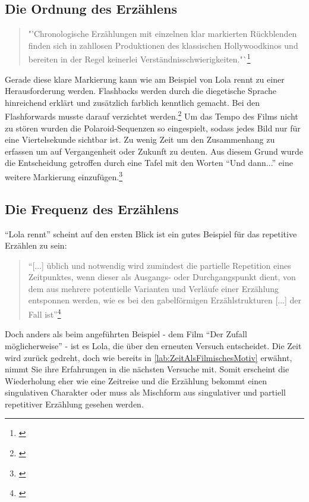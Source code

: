 \subsection{Die Ordnung des Erzählens}

\begin{quote}"'Chronologische Erzählungen mit einzelnen klar markierten Rückblenden finden sich in zahllosen Produktionen des klassischen Hollywoodkinos und bereiten in der Regel keinerlei Verständnisschwierigkeiten."`\footnote{\cite[S. 204]{keutzer2014filmanalyse}}\end{quote}
Gerade diese klare Markierung kann wie am Beispiel von Lola rennt zu einer Herausforderung werden. Flashbacks werden durch die diegetische Sprache hinreichend erklärt und zusätzlich farblich kenntlich gemacht. Bei den Flashforwards musste darauf verzichtet werden.\footnote{\cite[S. 7]{DIEDRINGLICHKEITDERLIEBE}}  Um das Tempo des Films nicht zu stören wurden die Polaroid-Sequenzen so eingespielt, sodass jedes Bild nur für eine Viertelsekunde sichtbar ist. Zu wenig Zeit um den Zusammenhang zu erfassen um auf Vergangenheit oder Zukunft zu deuten. Aus diesem Grund wurde die Entscheidung getroffen durch eine Tafel mit den Worten "`Und dann..."' eine weitere Markierung einzufügen.\footnote{\cite[S. 7]{DIEDRINGLICHKEITDERLIEBE}} 

\subsection{Die Frequenz des Erzählens}

"`Lola rennt"' scheint auf den ersten Blick ist ein gutes Beispiel für das repetitive Erzählen zu sein:
\begin{quote}"`[...] üblich und
notwendig wird zumindest die partielle Repetition eines Zeitpunktes, wenn dieser als Ausgangs- oder Durchgangspunkt dient, von dem aus mehrere potentielle Varianten und Verläufe einer Erzählung entsponnen werden, wie es bei den gabelförmigen Erzählstrukturen
[...] der Fall ist"'\footnote{\cite[S. 216]{keutzer2014filmanalyse}}\end{quote}
Doch anders als beim angeführten Beispiel - dem Film "`Der Zufall möglicherweise"' - ist es Lola, die über den erneuten Versuch entscheidet. Die Zeit wird zurück gedreht, doch wie bereits in \ref{lab:ZeitAlsFilmischesMotiv} erwähnt, nimmt Sie ihre Erfahrungen in die nächsten Versuche mit. Somit erscheint die Wiederholung eher wie eine Zeitreise und die Erzählung bekommt einen singulativen Charakter oder muss als Mischform aus singulativer und partiell repetitiver Erzählung gesehen werden.

